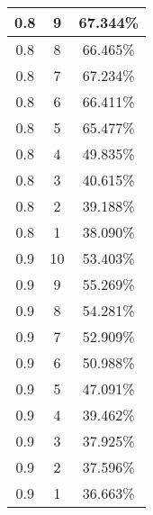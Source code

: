 \begin{center}
\begin{longtable}{|c|c|c|}
\hline
0.8 & 9 & 67.344\% \\
\hline
0.8 & 8 & 66.465\% \\
\hline
0.8 & 7 & 67.234\% \\
\hline
0.8 & 6 & 66.411\% \\
\hline
0.8 & 5 & 65.477\% \\
\hline
0.8 & 4 & 49.835\% \\
\hline
0.8 & 3 & 40.615\% \\
\hline
0.8 & 2 & 39.188\% \\
\hline
0.8 & 1 & 38.090\% \\
\hline
\hline
0.9 & 10 & 53.403\% \\
\hline
0.9 & 9 & 55.269\% \\
\hline
0.9 & 8 & 54.281\% \\
\hline
0.9 & 7 & 52.909\% \\
\hline
0.9 & 6 & 50.988\% \\
\hline
0.9 & 5 & 47.091\% \\
\hline
0.9 & 4 & 39.462\% \\
\hline
0.9 & 3 & 37.925\% \\
\hline
0.9 & 2 & 37.596\% \\
\hline
0.9 & 1 & 36.663\% \\
\hline
\hline
\end{longtable}
\end{center}
